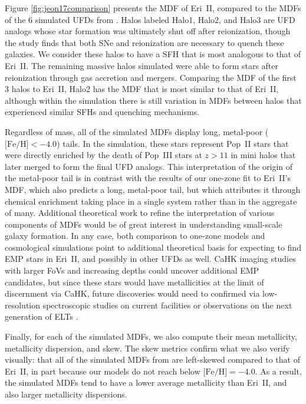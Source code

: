 \documentclass[twocolumn]{aastex63}
\begin{document}
\par Figure \ref{fig:jeon17comparison} presents the MDF of Eri~II, compared to the MDFs of the 6 simulated UFDs from \citet{jeon2017popIII}. Halos labeled Halo1, Halo2, and Halo3 are UFD analogs whose star formation was ultimately shut off after reionization, though the study finds that both SNe and reionization are necessary to quench these galaxies. We consider these halos to have a SFH that is most analogous to that of Eri~II. The remaining massive halos simulated were able to form stars after reionization through gas accretion and mergers. Comparing the MDF of the first 3 halos to Eri~II, Halo2 has the MDF that is most similar to that of Eri~II, although within the simulation there is still variation in MDFs between halos that experienced similar SFHs and quenching mechanisms. 

\par Regardless of mass, all of the simulated MDFs display long, metal-poor ($\mbox{[Fe/H]}<-4.0$) tails. In the simulation, these stars represent Pop~II stars that were directly enriched by the death of Pop~III stars at $z>11$ in mini halos that later merged to form the final UFD analogs. This interpretation of the origin of the metal-poor tail is in contrast with the results of our one-zone fit to Eri~II's MDF, which also predicts a long, metal-poor tail, but which attributes it through chemical enrichment taking place in a single system rather than in the aggregate of many. Additional theoretical work to refine the interpretation of various components of MDFs would be of great interest in understanding small-scale galaxy formation. In any case, both comparison to one-zone models and cosmological simulations point to additional theoretical basis for expecting to find EMP stars in Eri~II, and possibly in other UFDs as well. CaHK imaging studies with larger FoVs and increasing depths could uncover additional EMP candidates, but since these stars would have metallicities at the limit of discernment via CaHK, future discoveries would need to confirmed via low-resolution spectroscopic studies on current facilities or observations on the next generation of ELTs \citep[see, e.g., ][]{sandford2020}.

\par Finally, for each of the simulated MDFs, we also compute their mean metallicity, metallicity dispersion, and skew. The skew metrics confirm what we also verify visually: that all of the simulated MDFs from \citet{jeon2017popIII} are left-skewed compared to that of Eri~II, in part because our models do not reach below $\mbox{[Fe/H]}=-4.0$. As a result, the simulated MDFs tend to have a lower average metallicity than Eri~II, and also larger metallicity dispersions. 
\end{document}
